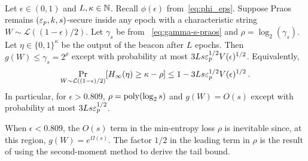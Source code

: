 
~

\begin{theorem}\label{thm:minentropy-loss-praos-multi-epochs}  
  Let $\epsilon \in (0, 1)$ and $L,\kappa \in \mathbb{N}$. 
  Recall $\phi(\epsilon)$ from~\eqref{eq:phi_eps}.
  Suppose Praos 
  remains $(\mathsf{\varepsilon}_p, k, s)$-secure 
  inside any epoch 
  with a characteristic string $W \sim \mathcal{L}((1-\epsilon)/2)$. 
  Let $\gamma_s$ be from ~\eqref{eq:gamma-s-praos} and 
  $\rho = \log_2(\gamma_s)$. 
  Let $\eta \in \{0,1\}^\kappa$ be the output of the beacon after $L$ epochs.
  Then $g(W) \leq \gamma_s = 2^\rho$ except with probability at most $3 L s \mathsf{\varepsilon}_p^{1/2} V(\epsilon)^{1/2}$.
  Equivalently,
  $$
    \Pr_{W \sim \mathcal{L}((1-\epsilon)/2)}[H_\infty(\eta) \geq \kappa - \rho] 
      \leq 1 - 3 L s \mathsf{\varepsilon}_p^{1/2} V(\epsilon)^{1/2} \,.
  $$
  In particular, for $\epsilon > 0.809$, 
  $\rho = \mathrm{poly}(\log_2 s)$ and $g(W) = O(s)$ 
  except with probability at most $3 L s \mathsf{\varepsilon}_p^{1/2}$.
\end{theorem}

\begin{remark*}
  When $\epsilon < 0.809$, 
  the $O(s)$ term in the min-entropy loss $\rho$ 
  is inevitable since, at this region, 
  $g(W) = e^{\Omega(s)}$.
  The factor $1/2$ in the leading term in $\rho$ 
  is the result of using the second-moment method 
  to derive the tail bound.
\end{remark*}

